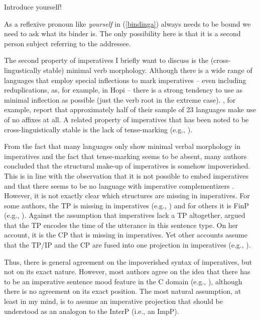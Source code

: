 \begin{exe}
\ex Introduce yourself! \label{bindinga}
\end{exe} 

\noindent As a reflexive pronoun like \textit{yourself} in (\ref{bindinga}) always needs to be bound we need to ask what its binder is. The only possibility here is that it is a second person subject referring to the addressee.

The second property of imperatives I briefly want to discuss is the (cross-lingustically stable) minimal verb morphology. Although there is a wide range of languages that employ special inflections to mark imperatives -- even including reduplications, as, for example, in Hopi \citep{benett1981} -- there is a strong tendency to use as minimal inflection as possible (just the verb root in the extreme case). \citet[172--173]{sadock1985speech}, for example, report that approximately half of their sample of 23 languages make use of no affixes at all. A related property of imperatives that has been noted to be cross-linguistically stable is the lack of tense-marking (e.g., \citealt{sadock1985speech}).

From the fact that many languages only show minimal verbal morphology in imperatives and the fact that tense-marking seems to be absent, many authors concluded that the structural make-up of imperatives is somehow impoverished. This is in line with the observation that it is not possible to embed imperatives \citep[78]{katz1964theory} and that there seems to be no language with imperative complementizers \citep[281]{konig2007speech}. However, it is not exactly clear which structures are missing in imperatives. For some authors, the TP is missing in imperatives (e.g., \citealt{zanuttini1991syntactic}) and for others it is FinP (e.g., \citealt{platzack1998subject}). Against the assumption that imperatives lack a TP altogether, \citet{jensen2007favour} argued that the TP encodes the time of the utterance in this sentence type. On her account, it is the CP that is missing in imperatives. Yet other accounts assume that the TP/IP and the CP are fused into one projection in imperatives (e.g., \citealt{wratil2005syntax}).

Thus, there is general agreement on the impoverished syntax of imperatives, but not on its exact nature. However, most authors agree on the idea that there has to be an imperative sentence mood feature in the C domain (e.g., \citealt{rivero1995imperatives, zanuttini1997negation, platzack1998subject, potsdam2007analysing}), although there is no agreement on its exact position. The most natural assumption, at least in my mind, is to assume an imperative projection that should be understood as an analogon to the InterP (i.e., an ImpP). 

